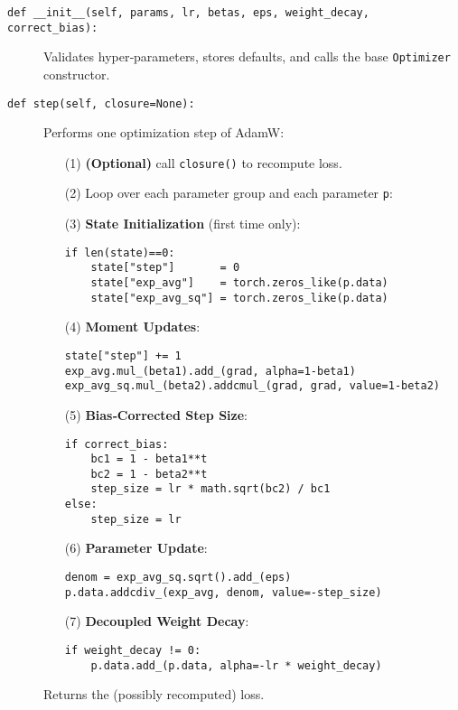 \documentclass{article}
\theoremstyle{definition}
\begin{document}
\begin{description}

  \item[\texttt{def \_\_init\_\_(self, params, lr, betas, eps, weight\_decay, correct\_bias):}]  
    Validates hyper‐parameters, stores defaults, and calls the base \texttt{Optimizer} constructor.


  \item[\texttt{def step(self, closure=None):}]  
    Performs one optimization step of AdamW:
    \begin{enumerate}
      \item[(1)] \textbf{(Optional)} call \texttt{closure()} to recompute loss.
      \item[(2)] Loop over each parameter group and each parameter \texttt{p}:
      \item[(3)] \textbf{State Initialization} (first time only):
\begin{verbatim}
if len(state)==0:
    state["step"]       = 0
    state["exp_avg"]    = torch.zeros_like(p.data)
    state["exp_avg_sq"] = torch.zeros_like(p.data)
\end{verbatim}
      \item[(4)] \textbf{Moment Updates}:
\begin{verbatim}
state["step"] += 1
exp_avg.mul_(beta1).add_(grad, alpha=1-beta1)
exp_avg_sq.mul_(beta2).addcmul_(grad, grad, value=1-beta2)
\end{verbatim}
      \item[(5)] \textbf{Bias‐Corrected Step Size}:
\begin{verbatim}
if correct_bias:
    bc1 = 1 - beta1**t
    bc2 = 1 - beta2**t
    step_size = lr * math.sqrt(bc2) / bc1
else:
    step_size = lr
\end{verbatim}
      \item[(6)] \textbf{Parameter Update}:
\begin{verbatim}
denom = exp_avg_sq.sqrt().add_(eps)
p.data.addcdiv_(exp_avg, denom, value=-step_size)
\end{verbatim}
      \item[(7)] \textbf{Decoupled Weight Decay}:
\begin{verbatim}
if weight_decay != 0:
    p.data.add_(p.data, alpha=-lr * weight_decay)
\end{verbatim}
    \end{enumerate}
    Returns the (possibly recomputed) loss.
\end{description}

  
\end{document}
